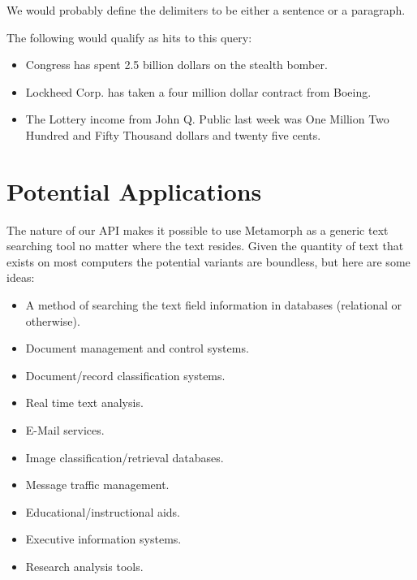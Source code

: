 We would probably define the delimiters to be either a sentence or
a paragraph.

The following would qualify as hits to this query:
\begin{itemize}
\item
Congress has spent 2.5 billion dollars on the
stealth bomber.
\item
Lockheed Corp. has taken a four million dollar
contract from Boeing.
\item
The Lottery income from John Q. Public last week
was One Million Two Hundred and Fifty Thousand
dollars and twenty five cents.
\end{itemize}

\section{Potential Applications}

The nature of our API makes it possible to use Metamorph as a
generic text searching tool no matter where the text resides.
Given the quantity of text that exists on most computers the
potential variants are boundless, but here are some ideas:

\begin{itemize}
\item A method of searching the text field information in databases
 (relational or otherwise).

\item Document management and control systems.

\item Document/record classification systems.

\item Real time text analysis.

\item E-Mail services.

\item Image classification/retrieval databases.

\item Message traffic management.

\item Educational/instructional aids.

\item Executive information systems.

\item Research analysis tools.
\end{itemize}

